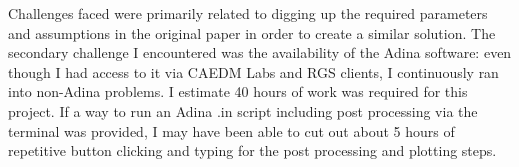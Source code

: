 \documentclass[10pt,english]{article}
\begin{document}
Challenges faced were primarily related to digging up the required parameters and assumptions in the original paper in order to create a similar solution.  The secondary challenge I encountered was the availability of the Adina software: even though I had access to it via CAEDM Labs and RGS clients, I continuously ran into non-Adina problems.  I estimate 40 hours of work was required for this project.  If a way to run an Adina .in script including post processing via the terminal was provided, I may have been able to cut out about 5 hours of repetitive button clicking and typing for the post processing and plotting steps.
\end{document}
